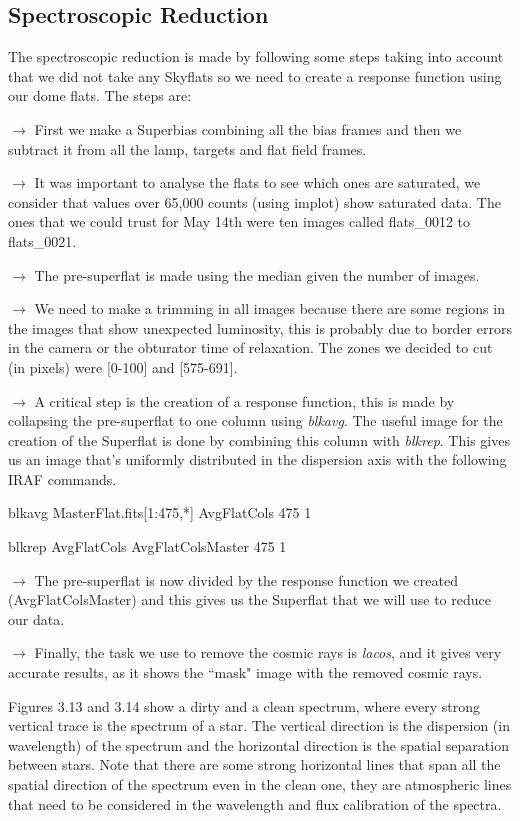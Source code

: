 \subsection{Spectroscopic Reduction}

The spectroscopic reduction is made by following some steps taking into account that we did not take any Skyflats so we need to create a response function using our dome flats. The steps are:

$\rightarrow$ First we make a Superbias combining all the bias frames and then we subtract it from all the lamp, targets and flat field frames.

$\rightarrow$ It was important to analyse the flats to see which ones are saturated, we consider that values over 65,000 counts (using implot) show saturated data. The ones that we could trust for May 14th were ten images called flats\_0012 to flats\_0021.

$\rightarrow$ The pre-superflat is made using the median given the number of images.

$\rightarrow$ We need to make a trimming in all images because there are some regions in the images that show unexpected luminosity, this is probably due to border errors in the camera or the obturator time of relaxation. The zones we decided to cut (in pixels) were [0-100] and [575-691].  

$\rightarrow$ A critical step is the creation of a response function, this is made by collapsing the pre-superflat to one column using \textit{blkavg}. The useful image for the creation of the Superflat is done by combining this column with \textit{blkrep}. This gives us an image that's uniformly distributed in the dispersion axis with the following IRAF commands.

blkavg MasterFlat.fits[1:475,*] AvgFlatCols 475 1

blkrep AvgFlatCols AvgFlatColsMaster 475 1

$\rightarrow$ The pre-superflat is now divided by the response function we created (AvgFlatColsMaster) and this gives us the Superflat that we will use to reduce our data.

$\rightarrow$ Finally, the task we use to remove the cosmic rays is \textit{lacos}, and it gives very accurate results, as it shows the ``mask" image with the removed cosmic rays.

Figures 3.13 and 3.14 show a dirty and a clean spectrum, where every strong vertical trace is the spectrum of a star. The vertical direction is the dispersion (in wavelength) of the spectrum and the horizontal direction is the spatial separation between stars. Note that there are some strong horizontal lines that span all the spatial direction of the spectrum even in the clean one, they are atmospheric lines that need to be considered in the wavelength and flux calibration of the spectra.

